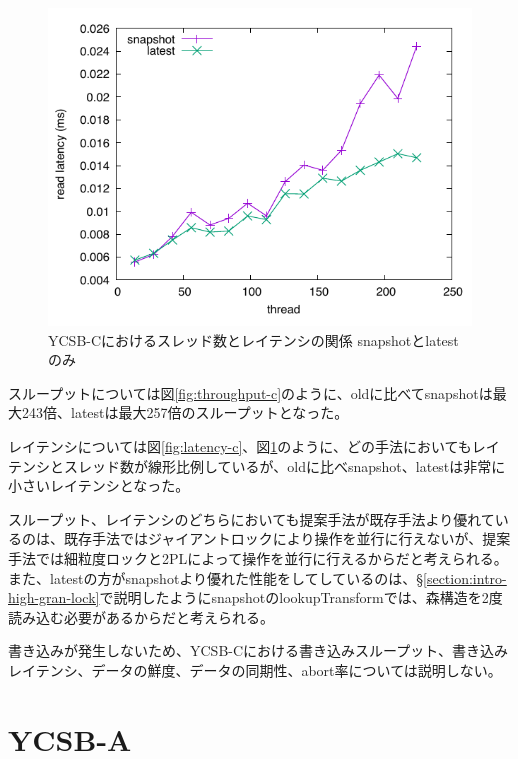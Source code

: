 \documentclass[a4paper]{jreport}	%
\begin{document}
\begin{figure}[h] 
\centering
\includegraphics[width=15cm]{ycsb-c/opposite-read-latency2}
\caption{YCSB-Cにおけるスレッド数とレイテンシの関係 snapshotとlatestのみ}
\label{fig:latency-c2}
\end{figure}

スループットについては図\ref{fig:throughput-c}のように、oldに比べてsnapshotは最大243倍、latestは最大257倍のスループットとなった。

レイテンシについては図\ref{fig:latency-c}、図\ref{fig:latency-c2}のように、どの手法においてもレイテンシとスレッド数が線形比例しているが、oldに比べsnapshot、latestは非常に小さいレイテンシとなった。

スループット、レイテンシのどちらにおいても提案手法が既存手法より優れているのは、既存手法ではジャイアントロックにより操作を並行に行えないが、提案手法では細粒度ロックと2PLによって操作を並行に行えるからだと考えられる。また、latestの方がsnapshotより優れた性能をしてしているのは、§\ref{section:intro-high-gran-lock}で説明したようにsnapshotのlookupTransformでは、森構造を2度読み込む必要があるからだと考えられる。

書き込みが発生しないため、YCSB-Cにおける書き込みスループット、書き込みレイテンシ、データの鮮度、データの同期性、abort率については説明しない。

\section{YCSB-A}
\label{section:ycsb-a}

\end{document}

